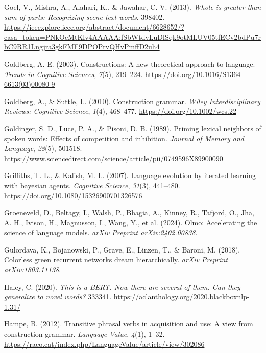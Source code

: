 \documentclass[
  12pt,
  letterpaper,
]{scrreport}
\newlength{\cslhangindent}
\newenvironment{CSLReferences}[2] %
 {\begin{list}{}{%
  \setlength{\itemindent}{0pt}
  \setlength{\leftmargin}{0pt}
  \setlength{\parsep}{0pt}
  \ifodd #1
   \setlength{\leftmargin}{\cslhangindent}
   \setlength{\itemindent}{-1\cslhangindent}
  \fi
  \setlength{\itemsep}{#2\baselineskip}}}
 {\end{list}}
\begin{document}
\begin{CSLReferences}{1}{0}
Goel, V., Mishra, A., Alahari, K., \& Jawahar, C. V. (2013). \emph{Whole
is greater than sum of parts: Recognizing scene text words}. 398402.
\url{https://ieeexplore.ieee.org/abstract/document/6628652/?casa_token=PNkOeMtKlv4AAAAA:fSbWtdvLuDlSqk9otMLUV05tfECv2bdPu7rbC9RR1Lngjra3gkFMF9DPOPrvQHvPmffD2uh4}

Goldberg, A. E. (2003). Constructions: A new theoretical approach to
language. \emph{Trends in Cognitive Sciences}, \emph{7}(5), 219--224.
\url{https://doi.org/10.1016/S1364-6613(03)00080-9}

Goldberg, A., \& Suttle, L. (2010). Construction grammar. \emph{Wiley
Interdisciplinary Reviews: Cognitive Science}, \emph{1}(4), 468--477.
\url{https://doi.org/10.1002/wcs.22}

Goldinger, S. D., Luce, P. A., \& Pisoni, D. B. (1989). Priming lexical
neighbors of spoken words: Effects of competition and inhibition.
\emph{Journal of Memory and Language}, \emph{28}(5), 501518.
\url{https://www.sciencedirect.com/science/article/pii/0749596X89900090}

Griffiths, T. L., \& Kalish, M. L. (2007). Language evolution by
iterated learning with bayesian agents. \emph{Cognitive Science},
\emph{31}(3), 441--480. \url{https://doi.org/10.1080/15326900701326576}

Groeneveld, D., Beltagy, I., Walsh, P., Bhagia, A., Kinney, R., Tafjord,
O., Jha, A. H., Ivison, H., Magnusson, I., Wang, Y., et al. (2024).
Olmo: Accelerating the science of language models. \emph{arXiv Preprint
arXiv:2402.00838}.

Gulordava, K., Bojanowski, P., Grave, E., Linzen, T., \& Baroni, M.
(2018). Colorless green recurrent networks dream hierarchically.
\emph{arXiv Preprint arXiv:1803.11138}.

Haley, C. (2020). \emph{This is a BERT. Now there are several of them.
Can they generalize to novel words?} 333341.
\url{https://aclanthology.org/2020.blackboxnlp-1.31/}

Hampe, B. (2012). Transitive phrasal verbs in acquisition and use: A
view from construction grammar. \emph{Language Value}, \emph{4}(1),
1--32.
\url{https://raco.cat/index.php/LanguageValue/article/view/302086}


\end{CSLReferences}
\end{document}
